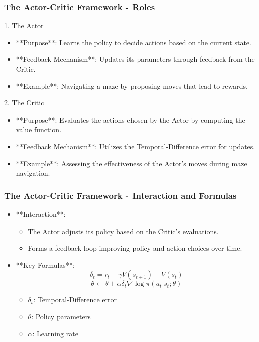 \documentclass[aspectratio=169]{beamer}
\begin{document}
\begin{frame}[fragile]
    \frametitle{The Actor-Critic Framework - Roles}
    \begin{block}{1. The Actor}
        \begin{itemize}
            \item **Purpose**: Learns the policy to decide actions based on the current state.
            \item **Feedback Mechanism**: Updates its parameters through feedback from the Critic.
            \item **Example**: Navigating a maze by proposing moves that lead to rewards.
        \end{itemize}
    \end{block}

    \begin{block}{2. The Critic}
        \begin{itemize}
            \item **Purpose**: Evaluates the actions chosen by the Actor by computing the value function.
            \item **Feedback Mechanism**: Utilizes the Temporal-Difference error for updates.
            \item **Example**: Assessing the effectiveness of the Actor's moves during maze navigation.
        \end{itemize}
    \end{block}
\end{frame}

\begin{frame}[fragile]
    \frametitle{The Actor-Critic Framework - Interaction and Formulas}
    \begin{itemize}
        \item **Interaction**:
        \begin{itemize}
            \item The Actor adjusts its policy based on the Critic's evaluations.
            \item Forms a feedback loop improving policy and action choices over time.
        \end{itemize}
        
        \item **Key Formulas**:
        \begin{equation}
            \delta_t = r_t + \gamma V(s_{t+1}) - V(s_t)
        \end{equation}
        \begin{equation}
            \theta \leftarrow \theta + \alpha \delta_t \nabla \log \pi(a_t | s_t; \theta)
        \end{equation}
        \begin{itemize}
            \item \(\delta_t\): Temporal-Difference error
            \item \( \theta \): Policy parameters
            \item \( \alpha \): Learning rate
        \end{itemize}
    \end{itemize}
\end{frame}
\end{document}
